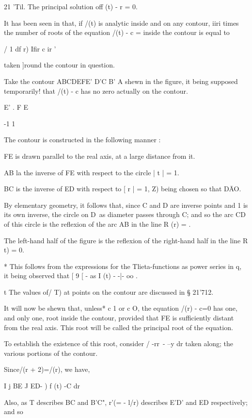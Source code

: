 21 'Til. The principal solution off (t) - r = 0.

It has been seen in  that, if /(t) is analytic inside and on any
contour, iiri times the number of roots of the equation /(t) - c =
inside the contour is equal to

/ 1 df r) Ifir c ir '

taken ]round the contour in question.

Take the contour ABCDEFE' D'C B' A shewn in the figure, it being
supposed temporarily! that /(t) - c has no zero actually on the
contour.

E' . F E

-1 1

The contour is constructed in the following manner :

FE is drawn parallel to the real axis, at a large distance from it.

AB la the inverse of FE with respect to the circle | t | = 1.

BC is the inverse of ED with respect to [ r | = 1, Z) being chosen so
that D\=AO.

By elementary geometry, it follows that, since C and D are inverse
points and 1 is its own inverse, the circle on D\ as diameter passes
through C; and so the arc CD of this circle is the reflexion of the
arc AB in the line R (r) = .

The left-hand half of the figure is the reflexion of the right-hand
half in the line R t) = 0.

* This follows from the expressions for the Tlieta-functions as power
series in q, it being observed that [ 9 [ - as I (t) - -|- oo .

t The values of/ T) at points on the contour are discussed in §
21'712.

%
%

It will now be shewn that, unless* c 1 or c O, the equation /(r) - c=0
has one, and only one, root inside the contour, provided that FE is
sufficiently distant from the real axis. This root will be called the
principal root of the equation.

To establish the existence of this root, consider / -rr\ - --y dr
taken along; the various portions of the contour.

Since/(r + 2)=/(r), we have,

I j BE J ED- ) f (t) -C dr

Also, as T describes BC and B'C", r'(= - l/r) describes E'D' and ED
respectively; and so

